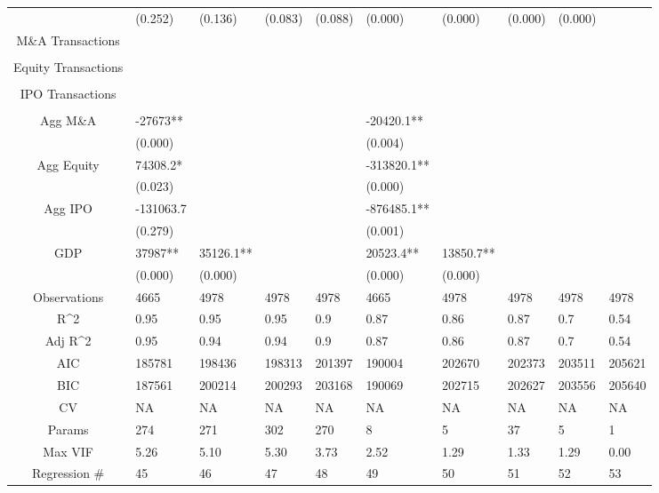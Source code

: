 \documentclass{article}
\begin{document}
\begin{table}[H]
\begin{tabular}{|clllllllll|}
   & (0.252) & (0.136) & (0.083) & (0.088) & (0.000) & (0.000) & (0.000) & (0.000) &  \\ 
  M\&A Transactions &  &  &  &  &  &  &  &  &  \\ 
   &  &  &  &  &  &  &  &  &  \\ 
  Equity Transactions &  &  &  &  &  &  &  &  &  \\ 
   &  &  &  &  &  &  &  &  &  \\ 
  IPO Transactions &  &  &  &  &  &  &  &  &  \\ 
   &  &  &  &  &  &  &  &  &  \\ 
  Agg M\&A & -27673** &  &  &  & -20420.1** &  &  &  &  \\ 
   & (0.000) &  &  &  & (0.004) &  &  &  &  \\ 
  Agg Equity & 74308.2* &  &  &  & -313820.1** &  &  &  &  \\ 
   & (0.023) &  &  &  & (0.000) &  &  &  &  \\ 
  Agg IPO & -131063.7 &  &  &  & -876485.1** &  &  &  &  \\ 
   & (0.279) &  &  &  & (0.001) &  &  &  &  \\ 
  GDP & 37987** & 35126.1** &  &  & 20523.4** & 13850.7** &  &  &  \\ 
   & (0.000) & (0.000) &  &  & (0.000) & (0.000) &  &  &  \\ 
  \hline 
 Observations & 4665 & 4978 & 4978 & 4978 & 4665 & 4978 & 4978 & 4978 & 4978 \\ 
  R^2 & 0.95 & 0.95 & 0.95 & 0.9 & 0.87 & 0.86 & 0.87 & 0.7 & 0.54 \\ 
  Adj R^2 & 0.95 & 0.94 & 0.94 & 0.9 & 0.87 & 0.86 & 0.87 & 0.7 & 0.54 \\ 
  AIC & 185781 & 198436 & 198313 & 201397 & 190004 & 202670 & 202373 & 203511 & 205621 \\ 
  BIC & 187561 & 200214 & 200293 & 203168 & 190069 & 202715 & 202627 & 203556 & 205640 \\ 
  CV & NA & NA & NA & NA & NA & NA & NA & NA & NA \\ 
  Params & 274 & 271 & 302 & 270 & 8 & 5 & 37 & 5 & 1 \\ 
  Max VIF & 5.26 & 5.10 & 5.30 & 3.73 & 2.52 & 1.29 & 1.33 & 1.29 & 0.00 \\ 
  Regression \# & 45 & 46 & 47 & 48 & 49 & 50 & 51 & 52 & 53 \\ 
   \hline
\end{tabular}
 
\end{table}
\end{document}
